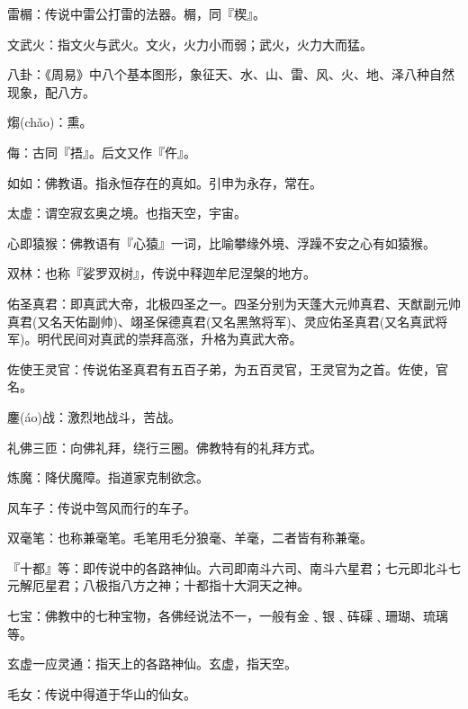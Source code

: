 \startbuffer[290]
雷榍：传说中雷公打雷的法器。榍，同『楔』。
\stopbuffer


\startbuffer[291]
文武火：指文火与武火。文火，火力小而弱；武火，火力大而猛。
\stopbuffer


\startbuffer[292]
八卦：《周易》中八个基本图形，象征天、水、山、雷、风、火、地、泽八种自然现象，配八方。
\stopbuffer


\startbuffer[293]
煼(chǎo)：熏。
\stopbuffer


\startbuffer[294]
侮：古同『捂』。后文又作『仵』。
\stopbuffer


\startbuffer[295]
如如：佛教语。指永恒存在的真如。引申为永存，常在。
\stopbuffer


\startbuffer[296]
太虚：谓空寂玄奥之境。也指天空，宇宙。
\stopbuffer


\startbuffer[297]
心即猿猴：佛教语有『心猿』一词，比喻攀缘外境、浮躁不安之心有如猿猴。
\stopbuffer


\startbuffer[298]
双林：也称『娑罗双树』，传说中释迦牟尼涅槃的地方。
\stopbuffer


\startbuffer[299]
佑圣真君：即真武大帝，北极四圣之一。四圣分别为天蓬大元帅真君、天猷副元帅真君(又名天佑副帅)、翊圣保德真君(又名黑煞将军)、灵应佑圣真君(又名真武将军)。明代民间对真武的崇拜高涨，升格为真武大帝。
\stopbuffer


\startbuffer[300]
佐使王灵官：传说佑圣真君有五百子弟，为五百灵官，王灵官为之首。佐使，官名。
\stopbuffer


\startbuffer[301]
鏖(áo)战：激烈地战斗，苦战。
\stopbuffer


\startbuffer[302]
礼佛三匝：向佛礼拜，绕行三圈。佛教特有的礼拜方式。
\stopbuffer


\startbuffer[303]
炼魔：降伏魔障。指道家克制欲念。
\stopbuffer


\startbuffer[304]
风车子：传说中驾风而行的车子。
\stopbuffer


\startbuffer[305]
双毫笔：也称兼毫笔。毛笔用毛分狼毫、羊毫，二者皆有称兼毫。
\stopbuffer


\startbuffer[306]
『十都』等：即传说中的各路神仙。六司即南斗六司、南斗六星君；七元即北斗七元解厄星君；八极指八方之神；十都指十大洞天之神。
\stopbuffer


\startbuffer[307]
七宝：佛教中的七种宝物，各佛经说法不一，一般有金﹑银﹑砗磲﹑珊瑚、琉璃等。
\stopbuffer


\startbuffer[308]
玄虚一应灵通：指天上的各路神仙。玄虚，指天空。
\stopbuffer


\startbuffer[309]
毛女：传说中得道于华山的仙女。
\stopbuffer


